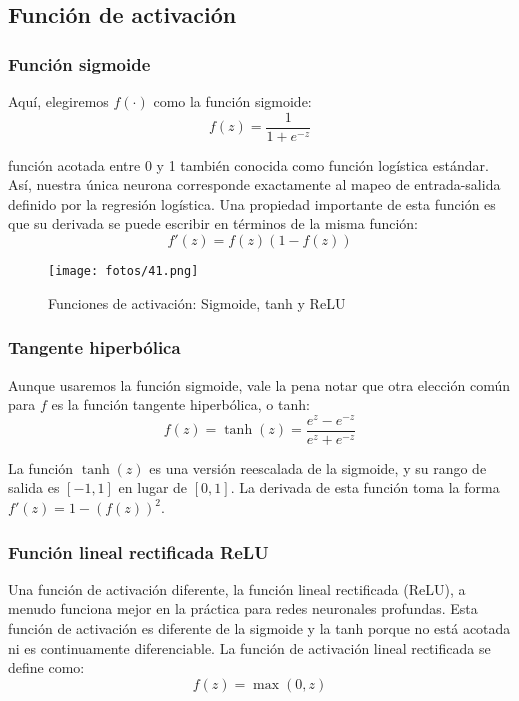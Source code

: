 \subsection{Función de activación}

\subsubsection{Función sigmoide}

\noindent Aquí, elegiremos $f(\cdot)$ como la función sigmoide:
\begin{equation}
f(z) = \frac{1}{1 + e^{-z}}
\end{equation}

\noindent función acotada entre 0 y 1 también conocida como función logística estándar. Así, nuestra única neurona corresponde exactamente al mapeo de entrada-salida definido por la regresión logística. Una propiedad importante de esta función es que su derivada se puede escribir en términos de la misma función:
\begin{equation}
f'(z) = f(z)(1 - f(z))
\end{equation}

\begin{figure}[h]
\centering
\texttt{[image: fotos/41.png]}
\caption{Funciones de activación: Sigmoide, tanh y ReLU}
\label{fig:7.2}
\end{figure}

\subsubsection{Tangente hiperbólica}

Aunque usaremos la función sigmoide, vale la pena notar que otra elección común para $f$ es la función tangente hiperbólica, o tanh:
\begin{equation}
f(z) = \tanh(z) = \frac{e^{z} - e^{-z}}{e^{z} + e^{-z}}
\end{equation}

La función $\tanh(z)$ es una versión reescalada de la sigmoide, y su rango de salida es $[-1, 1]$ en lugar de $[0,1]$. La derivada de esta función toma la forma $f'(z) = 1 - (f(z))^2$. 

\subsubsection{Función lineal rectificada ReLU}

Una función de activación diferente, la función lineal rectificada (ReLU), a menudo funciona mejor en la práctica para redes neuronales profundas. Esta función de activación es diferente de la sigmoide y la tanh porque no está acotada ni es continuamente diferenciable. La función de activación lineal rectificada se define como:
\begin{equation}
f(z) = \max(0, z)
\end{equation}

